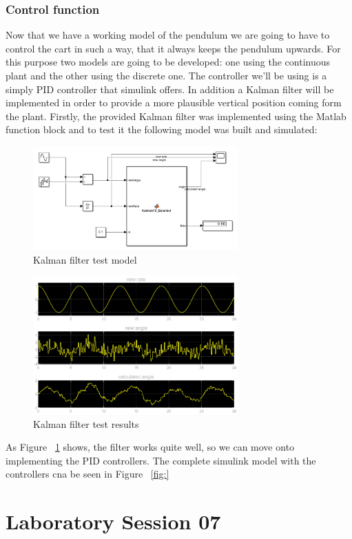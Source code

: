 \section{Control function}
Now that we have a working model of the pendulum we are going to have to control the cart in such a way, that it always keeps the pendulum upwards. For this purpose two models are going to be developed: one using the continuous plant and the other using the discrete one. The controller we'll be using is a simply PID controller that simulink offers. In addition a Kalman filter will be implemented in order to provide a more plausible vertical position coming form the plant.
Firstly, the provided Kalman filter was implemented using the Matlab function block and to test it the following model was built and simulated:
\begin{figure}[H]
		\centering
		\includegraphics[width=0.7\textwidth]{figures/kalman_test.png}
		\caption{Kalman filter test model}
		\label{fig:kalman_test}
\end{figure}
\begin{figure}[H]
		\centering
		\includegraphics[width=0.7\textwidth]{figures/kalman_test_results.eps}
		\caption{Kalman filter test results}
		\label{fig:kalman_test_results}
\end{figure}
As Figure ~\ref{fig:kalman_test} shows, the filter works quite well, so we can move onto implementing the PID controllers. The complete simulink model with the controllers cna be seen in Figure ~\ref{fig:}


\part{Laboratory Session 07}


